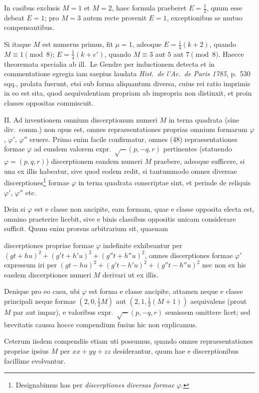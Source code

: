\documentclass[12pt,a4paper]{article}
\theoremstyle{plain}
\theoremstyle{definition}
\theoremstyle{remark}
\begin{document}
In casibus exclusis $M = 1$ et $M = 2$, haec formula praeberet $E = \tfrac{1}{2}$, quum esse debeat $E = 1$; pro $M = 3$ autem recte provenit $E = 1$, exceptionibus se mutuo compensantibus.

Si itaque $M$ est numerus primus, fit $\mu = 1$, adeoque $E = \tfrac{1}{4}(k+2)$, quando $M \equiv 1 \pmod{8}$; $E = \tfrac{1}{4}(k+e')$, quando $M \equiv 3$ aut $5$ aut $7 \pmod{8}$. Haecce theoremata specialia ab ill.~Le Gendre per inductionem detecta et in commentatione egregia iam saepius laudata \textit{Hist.~de l'Ac.~de Paris 1785}, p.~530 sqq., prolata fuerunt, etsi sub forma aliquantum diversa, cuius rei ratio imprimis in eo est sita, quod aequivalentiam propriam ab impropria non distinxit, et proin classes oppositas commiscuit.

\textsc{II.} Ad inventionem omnium discerptionum numeri $M$ in terna quadrata (sine div.~comm.) non opus est, omnes repraesentationes proprias omnium formarum $\varphi$, $\varphi'$, $\varphi''$ eruere. Primo enim facile confirmatur, omnes (48) repraesentationes formae $\varphi$ ad eundem valorem expr.~$\surd{-}(p,-q,r)$ pertinentes (statuendo $\varphi = (p,q,r)$) discerptionem eandem numeri $M$ praebere, adeoque sufficere, si una ex illis habeatur, sive quod eodem redit, si tantummodo omnes diversae discerptiones\footnote{Designabimus has per \textit{discerptiones diversas formae} $\varphi$.} formae $\varphi$ in terna quadrata conscriptae sint, et perinde de reliquis $\varphi'$, $\varphi''$ etc.

Dein si $\varphi$ est e classe non ancipite, eam formam, quae e classe opposita electa est, omnino praeterire licebit, sive e binis classibus oppositis unicam considerare sufficit. Quum enim prorsus arbitrarium sit, quaenam


discerptiones propriae formae $\varphi$ indefinite exhibeantur per $(gt + hu)^2 + (g't + h'u)^2 + (g''t + h''u)^2$, omnes discerptiones formae $\varphi'$ expressum iri per $(gt - hu)^2 + (g't - h'u)^2 + (g''t - h''u)^2$ nec non ex his easdem discerptiones numeri $M$ derivari ut ex illis.

Denique pro eo casu, ubi $\varphi$ est forma e classe ancipite, attamen neque e classe principali neque formae $(2,0,\tfrac{1}{2}M)$ aut $(2,1,\tfrac{1}{2}(M+1))$ aequivalens (prout $M$ par aut impar), e valoribus expr.~$\surd{-}(p,-q,r)$ semissem omittere licet; sed brevitatis caussa hocce compendium fusius hic non explicamus.

Ceterum iisdem compendiis etiam uti possumus, quando omnes repraesentationes propriae ipsius $M$ per $xx + yy + zz$ desiderantur, quum hae e discerptionibus facillime evolvantur.
\end{document}
